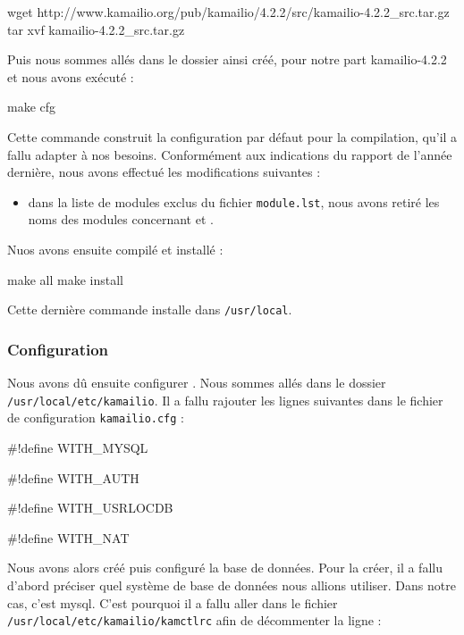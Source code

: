 \begin{shellcode}
wget http://www.kamailio.org/pub/kamailio/4.2.2/src/kamailio-4.2.2_src.tar.gz
tar xvf kamailio-4.2.2_src.tar.gz
\end{shellcode}

Puis nous sommes allés dans le dossier ainsi créé, pour notre part kamailio-4.2.2 et nous avons exécuté :

\begin{shellcode}
make cfg
\end{shellcode}

Cette commande construit la configuration par défaut pour la compilation, qu’il a fallu adapter à nos besoins. Conformément aux indications du rapport de l’année dernière, nous avons effectué les modifications suivantes :

\begin{itemize}
	\item{dans la liste de modules exclus du fichier \texttt{module.lst}, nous avons retiré les noms des modules concernant {\my} et {\rad}}.
\end{itemize}

Nuos avons ensuite compilé et installé {\kam} :
	
\begin{shellcode}
make all
make install
\end{shellcode}

Cette dernière commande installe {\kam} dans \texttt{/usr/local}.

\subsubsection{Configuration}

Nous avons dû ensuite configurer {\kam}. Nous sommes allés dans le dossier \texttt{/usr/local/etc/kamailio}. Il a fallu rajouter les lignes suivantes dans le fichier de configuration \texttt{kamailio.cfg} :

\#!define WITH\_MYSQL

\#!define WITH\_AUTH

\#!define WITH\_USRLOCDB

\#!define WITH\_NAT

Nous avons alors créé puis configuré la base de données. Pour la créer, il a fallu d'abord préciser quel système de base de données nous allions utiliser.
Dans notre cas, c'est mysql. C'est pourquoi il a fallu aller dans le fichier \texttt{/usr/local/etc/kamailio/kamctlrc} afin de décommenter la ligne :

